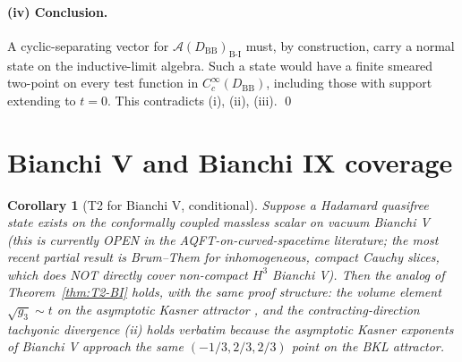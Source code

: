 \documentclass[11pt,a4paper]{article}
\newtheorem{corollary}[theorem]{Corollary}
\theoremstyle{definition}
\newcommand{\AA}{\mathcal{A}}
\newcommand{\BI}{\mathrm{B\text{-}I}}
\newcommand{\BB}{\mathrm{BB}}
\begin{document}
\paragraph{(iv) Conclusion.}

A cyclic-separating vector for $\AA(D_\BB)_\BI$ must, by construction,
carry a normal state on the inductive-limit algebra. Such a state would
have a finite smeared two-point on every test function in
$C_c^\infty(D_\BB)$, including those with support extending to $t=0$.
This contradicts (i), (ii), (iii). \qed

\section{Bianchi V and Bianchi IX coverage}

\begin{corollary}[T2 for Bianchi V, conditional]\label{cor:T2-BV}
Suppose a Hadamard quasifree state exists on the conformally coupled
massless scalar on vacuum Bianchi V (this is currently OPEN in the
AQFT-on-curved-spacetime literature; the most recent partial result is
Brum--Them \cite{Them-Brum2013} for inhomogeneous, compact Cauchy slices,
which does NOT directly cover non-compact $H^3$ Bianchi V). Then the
analog of Theorem~\ref{thm:T2-BI} holds, with the same proof structure:
the volume element $\sqrt{g_3}\sim t$ on the asymptotic Kasner attractor
\cite{WainwrightEllis1997}, and the contracting-direction tachyonic
divergence (ii) holds verbatim because the asymptotic Kasner exponents
of Bianchi V approach the same $(-1/3,2/3,2/3)$ point on the BKL
attractor.
\end{corollary}
\end{document}
